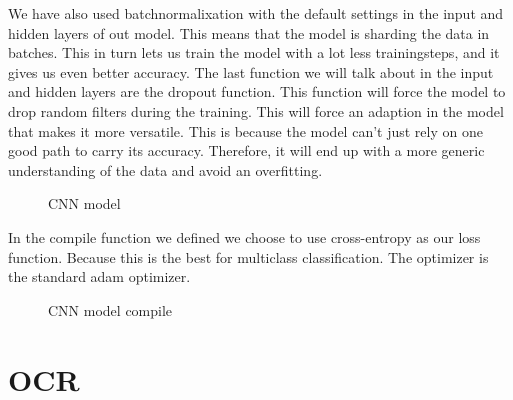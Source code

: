 We have also used batchnormalixation with the default settings in the input and hidden layers of out model.
This means that the model is sharding the data in batches.
This in turn lets us train the model with a lot less trainingsteps, and it gives us even better accuracy.
The last function we will talk about in the input and hidden layers are the dropout function.
This function will force the model to drop random filters during the training.
This will force an adaption in the model that makes it more versatile.
This is because the model can't just rely on one good path to carry its accuracy.
Therefore, it will end up with a more generic understanding of the data and avoid an overfitting.

\begin{figure}[h]
    \caption{CNN model}
    \label{fig:figure4}

\end{figure}

In the compile function we defined we choose to use cross-entropy as our loss function.
Because this is the best for multiclass classification.
The optimizer is the standard adam optimizer.



\begin{figure}[h]
    \caption{CNN model compile}
    \label{fig:figure5}

\end{figure}


\section{OCR}\label{sec:OCR_implementation}

